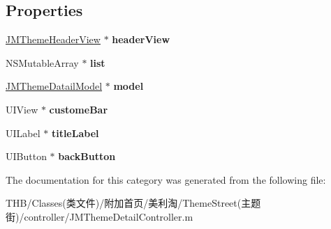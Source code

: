 \subsection*{Properties}
\begin{DoxyCompactItemize}
\item 
\mbox{\label{category_j_m_theme_detail_controller_07_08_aa66b0b7c765f44f490481c7ccdcccb64}} 
\mbox{\hyperlink{interface_j_m_theme_header_view}{J\+M\+Theme\+Header\+View}} $\ast$ {\bfseries header\+View}
\item 
\mbox{\label{category_j_m_theme_detail_controller_07_08_a19f74af5936a95020c0dfec28f9681d5}} 
N\+S\+Mutable\+Array $\ast$ {\bfseries list}
\item 
\mbox{\label{category_j_m_theme_detail_controller_07_08_ad8af6b385f20eeddbb7b144d83afd29e}} 
\mbox{\hyperlink{interface_j_m_theme_datail_model}{J\+M\+Theme\+Datail\+Model}} $\ast$ {\bfseries model}
\item 
\mbox{\label{category_j_m_theme_detail_controller_07_08_ab4668f5fc2cfd513ab0fa71db9b49c6f}} 
U\+I\+View $\ast$ {\bfseries custome\+Bar}
\item 
\mbox{\label{category_j_m_theme_detail_controller_07_08_a17d2d4f412f62c3eaa973477aa68a6bb}} 
U\+I\+Label $\ast$ {\bfseries title\+Label}
\item 
\mbox{\label{category_j_m_theme_detail_controller_07_08_a8d7fec6326cc3ce83796f443c3deeb69}} 
U\+I\+Button $\ast$ {\bfseries back\+Button}
\end{DoxyCompactItemize}


The documentation for this category was generated from the following file\+:\begin{DoxyCompactItemize}
\item 
T\+H\+B/\+Classes(类文件)/附加首页/美利淘/\+Theme\+Street(主题街)/controller/J\+M\+Theme\+Detail\+Controller.\+m\end{DoxyCompactItemize}
